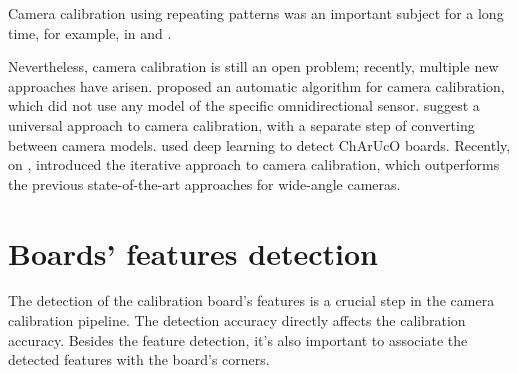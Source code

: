 Camera calibration using repeating patterns was an important subject for a long
time, for example, \cite{schaffalitzkyGeometricGroupingRepeated1998} in
\citeyear{schaffalitzkyGeometricGroupingRepeated1998} and
\cite{zhangFlexibleNewTechnique2000}.


Nevertheless, camera calibration is still an open problem; recently,
multiple new approaches have arisen.
\cite{scaramuzzaToolboxEasilyCalibrating2006} proposed an automatic algorithm
for camera calibration, which did not use any model of the specific omnidirectional
sensor.
\cite{lochmanBabelCalibUniversalApproach2021} suggest a universal approach
to camera calibration, with a separate step of converting between camera models.
\cite{huDeepChArUcoDark2019} used deep learning to detect ChArUcO boards.
Recently, on ,
\cite{duisterhofTartanCalibIterativeWideAngle2022} introduced the iterative
approach to camera calibration, which outperforms the previous state-of-the-art
approaches for wide-angle cameras.



\section{Boards' features detection}\label{sec:boards_features_detection}

The detection of the calibration board's features is a crucial step in the
camera calibration pipeline. The detection accuracy directly affects the
calibration accuracy. Besides the feature detection, it's also important to
associate the detected features with the board's corners.

